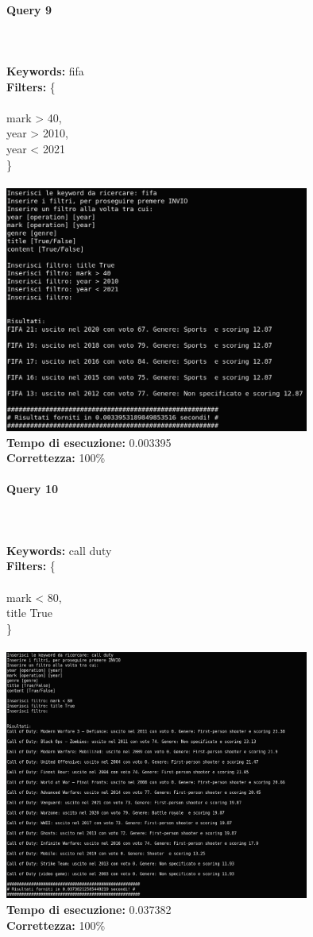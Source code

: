 \documentclass[12pt]{article}
\begin{document}
\paragraph{Query 9} ~ \\ \\

\noindent \textbf{Keywords: } fifa \\
\textbf{Filters: } \{ \\ \\
\indent mark > 40, \\
\indent year > 2010, \\
\indent year < 2021 \\
\} \\\\

\noindent \includegraphics[width=100mm]{Immagini/Image9.png} \\
\textbf{Tempo di esecuzione:} 0.003395 \\
\textbf{Correttezza:} 100\% \pagebreak

\paragraph{Query 10} ~ \\ \\

\noindent \textbf{Keywords: } call duty \\
\textbf{Filters: } \{ \\ \\
\indent mark < 80, \\
\indent title True \\
\} \\\\

\noindent \includegraphics[width=100mm]{Immagini/Image10.png} \\
\textbf{Tempo di esecuzione:} 0.037382 \\
\textbf{Correttezza:} 100\% \pagebreak
\end{document}
